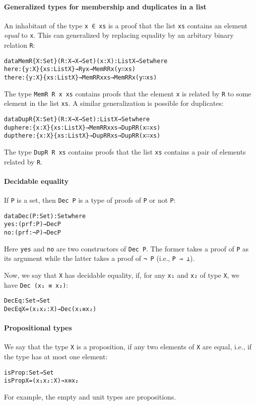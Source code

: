 \documentclass{eptcs}
\begin{document}
\paragraph{Generalized types for membership and duplicates in a list} 
An inhabitant of the type \verb;x ∈ xs; is a proof that the list \verb;xs;
contains an element \emph{equal} to \verb;x;. This can generalized by
replacing  equality by an arbitary binary relation \verb;R;:
\begin{alltt}
data  MemR \{X : Set\}(R : X → X → Set) (x : X) : List X → Set where
  here  : \{y : X\} \{xs : List X\} → R y x → MemR R x (y ∷ xs)
  there : \{y : X\} \{xs : List X\} → MemR R x xs → MemR R x (y ∷ xs)
\end{alltt}
The type \verb;MemR R x xs; contains proofs that the element \verb;x; is related by \verb;R; to
some element in the list \verb;xs;. A similar generalization is possible for duplicates:
\begin{alltt}
data DupR \{X : Set\}(R : X → X → Set) : List X → Set where
  duphere  : \{x : X\} \{xs : List X\} → MemR R x xs → DupR R (x ∷ xs)
  dupthere : \{x : X\} \{xs : List X\} → DupR R xs → DupR R (x ∷ xs)
\end{alltt}
The type \verb;DupR R xs; contains proofs that the list \verb;xs; contains
a pair of elements related by \verb;R;.

\paragraph{Decidable equality}
If \verb;P; is a set, then \verb;Dec P; is a type of proofs of 
\verb;P; or not \verb;P;:
\begin{alltt}
data Dec (P : Set) : Set where
  yes : (prf :  P)  → Dec P
  no  : (prf : ¬ P) → Dec P
\end{alltt}
Here \verb;yes; and \verb;no; are two constructors of \verb;Dec P;.
The former takes a proof of \verb;P; as its argument while the latter
takes a proof of \verb;¬ P; (i.e., \verb;P → ⊥;).

Now, we say that \verb;X; has decidable equality, if, for any \verb;x₁;
and \verb;x₂; of type \verb;X;, we have \verb;Dec (x₁ ≡ x₂);:
\begin{alltt}
DecEq : Set → Set
DecEq X = (x₁ x₂ : X) → Dec (x₁ ≡ x₂)
\end{alltt}

\paragraph{Propositional types} 
We say that the type \verb;X; is a proposition, if any two elements of \verb;X; are
equal, i.e., if the type has at most one element:
\begin{alltt}
isProp : Set → Set
isProp X = (x₁ x₂ : X) → x ≡ x₂
\end{alltt}
For example, the empty and unit types are propositions.
\end{document}
